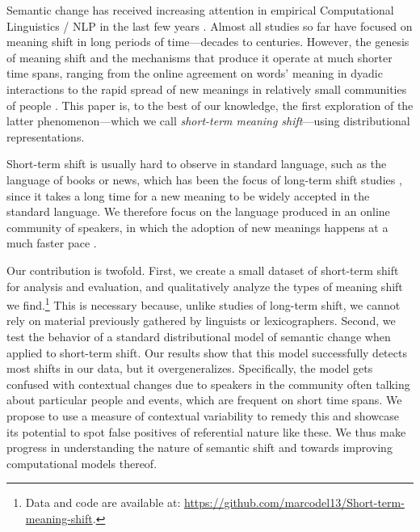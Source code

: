 Semantic change has received increasing attention in empirical Computational Linguistics / NLP in the last few years \cite{tang2018state,KutuzovEtal-coling2018}. Almost all studies so far have focused on meaning shift in long periods of time---decades to centuries. However, the genesis of meaning shift and the mechanisms that produce it operate at much shorter time spans, ranging
from the online agreement on words' meaning in dyadic interactions \cite{brennan1996conceptual} to the rapid spread of new meanings in relatively small communities of people \cite{wenger1998communities,eckert-mcconnellginet1992}.
This paper is, to the best of our knowledge, the first exploration of the latter phenomenon---which we call \textit{short-term meaning shift}---using distributional representations.

Short-term shift is usually hard to observe in standard language, such
as the language of books or news, which has been the focus of
long-term shift studies \cite[e.g.,][]{hamilton2016diachronic,kulkarni2015statistically}, since
it takes a long time for a new meaning to be widely accepted in the standard language. 
We therefore focus on the language produced in an online community of speakers, in which the 
adoption of new meanings happens at a much faster pace \cite{Clark96,hasan2009}.

Our contribution is twofold. First, we create a small dataset of short-term shift for analysis and evaluation, and qualitatively analyze the types of meaning shift we find.\footnote{Data and code are available at: 
\url{https://github.com/marcodel13/Short-term-meaning-shift}.
} This is necessary because, unlike studies of long-term shift, we cannot rely on material previously gathered by linguists or lexicographers.
Second, we test the behavior of a standard distributional model of semantic change when
 applied to short-term shift. 
Our results show that this model successfully detects most shifts in our data, but it overgeneralizes. Specifically, the model gets confused with contextual changes due to speakers in the community often talking about particular people and events, which are frequent on short time spans. 
We propose to use a measure of contextual variability to remedy this and showcase its potential to spot false positives of referential nature like these.
We thus make progress in understanding the nature of semantic shift and towards improving computational models thereof.


